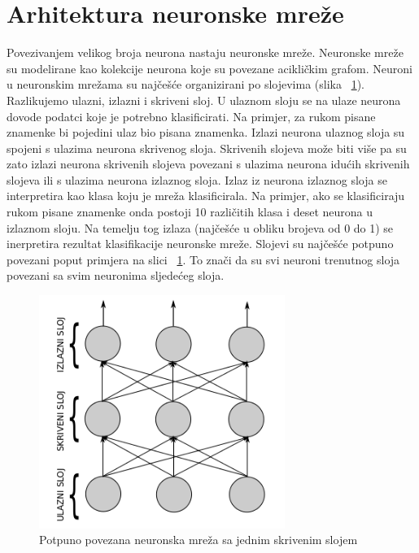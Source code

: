 \documentclass[times, utf8, zavrsni, numeric]{fer}
\begin{document}
\section{Arhitektura neuronske mreže}
Povezivanjem velikog broja neurona nastaju neuronske mreže. Neuronske mreže su modelirane kao kolekcije neurona koje su povezane acikličkim grafom. Neuroni u neuronskim mrežama su najčešće organizirani po slojevima (slika ~\ref{fig:neuronska-mreza}). Razlikujemo ulazni, izlazni i skriveni sloj. U ulaznom sloju se na ulaze neurona dovode podatci koje je potrebno klasificirati. Na primjer, za rukom pisane znamenke bi pojedini ulaz bio pisana znamenka. Izlazi neurona ulaznog sloja su spojeni s ulazima neurona skrivenog sloja. Skrivenih slojeva može biti više pa su zato izlazi neurona skrivenih slojeva povezani s ulazima neurona idućih skrivenih slojeva ili s ulazima neurona izlaznog sloja. Izlaz iz neurona izlaznog sloja se interpretira kao klasa koju je mreža klasificirala. Na primjer, ako se klasificiraju rukom pisane znamenke onda postoji 10 različitih klasa i deset neurona u izlaznom sloju. Na temelju tog izlaza (najčešće u obliku brojeva od 0 do 1) se inerpretira rezultat klasifikacije neuronske mreže. Slojevi su najčešće potpuno povezani poput primjera na slici ~\ref{fig:neuronska-mreza}. To znači da su svi neuroni trenutnog sloja povezani sa svim neuronima sljedećeg sloja.

\begin{figure}
    \centering
    \includegraphics[width=8cm]{img/slojevi-neuronska-mreza.png}
    \caption{Potpuno povezana neuronska mreža sa jednim skrivenim slojem}
    \label{fig:neuronska-mreza}
\end{figure}
\end{document}
